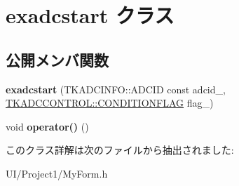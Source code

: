 \hypertarget{classexadcstart}{}\section{exadcstart クラス}
\label{classexadcstart}
\subsection*{公開メンバ関数}
\begin{DoxyCompactItemize}
\item 
\mbox{\label{classexadcstart_aebb1382ce90d77c855319da9087fdf25}} 
{\bfseries exadcstart} (T\+K\+A\+D\+C\+I\+N\+F\+O\+::\+A\+D\+C\+ID const adcid\+\_\+, \hyperlink{class_t_k_a_d_c_c_o_n_t_r_o_l_a4ec8bb3e68a489f7a757d08a855ffb61}{T\+K\+A\+D\+C\+C\+O\+N\+T\+R\+O\+L\+::\+C\+O\+N\+D\+I\+T\+I\+O\+N\+F\+L\+AG} flag\+\_\+)
\item 
\mbox{\label{classexadcstart_aaf643294d3a2081a502affb98baf7d8d}} 
void {\bfseries operator()} ()
\end{DoxyCompactItemize}


このクラス詳解は次のファイルから抽出されました\+:\begin{DoxyCompactItemize}
\item 
U\+I/\+Project1/My\+Form.\+h\end{DoxyCompactItemize}
